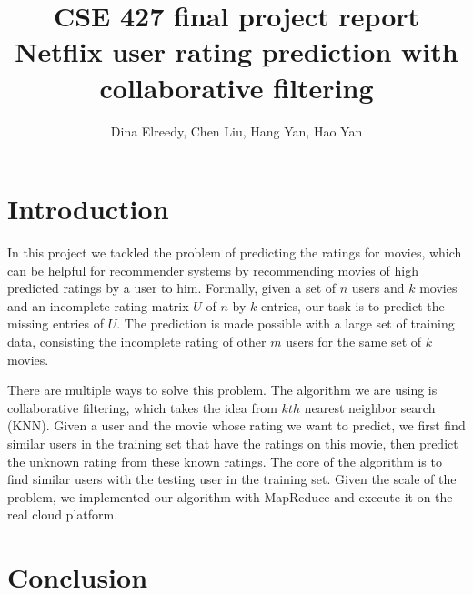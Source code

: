 \documentclass{article}
\title{CSE 427 final project report\\
  Netflix user rating prediction with collaborative filtering}
\author{Dina Elreedy, Chen Liu, Hang Yan, Hao Yan}
\begin{document}
\maketitle
  \section{Introduction}
  In this project we tackled the problem of predicting the ratings for
  movies, which can be helpful for recommender systems by recommending movies of high predicted ratings by a user to him. Formally, given a set of $n$ users and $k$ movies and an
  incomplete rating matrix $U$ of $n$ by $k$ entries, our task is to predict the
  missing entries of $U$. The prediction is made possible with a large
  set of training data, consisting the incomplete rating of other $m$
  users for the same set of $k$ movies.

  There are multiple ways to solve this problem. The algorithm we are
  using is collaborative filtering, which takes the idea from $kth$
  nearest neighbor search (KNN). Given a user and the movie whose
  rating we want to predict, we first find similar users in the
  training set that have the ratings on this movie, then predict the
  unknown rating from these known ratings. The core of the algorithm is
  to find similar users with the testing user in the training
  set. Given the scale of the problem, we implemented our algorithm
  with MapReduce and execute it on the real cloud platform.

  
    
  

  

  

  \section{Conclusion}

  
\end{document}
